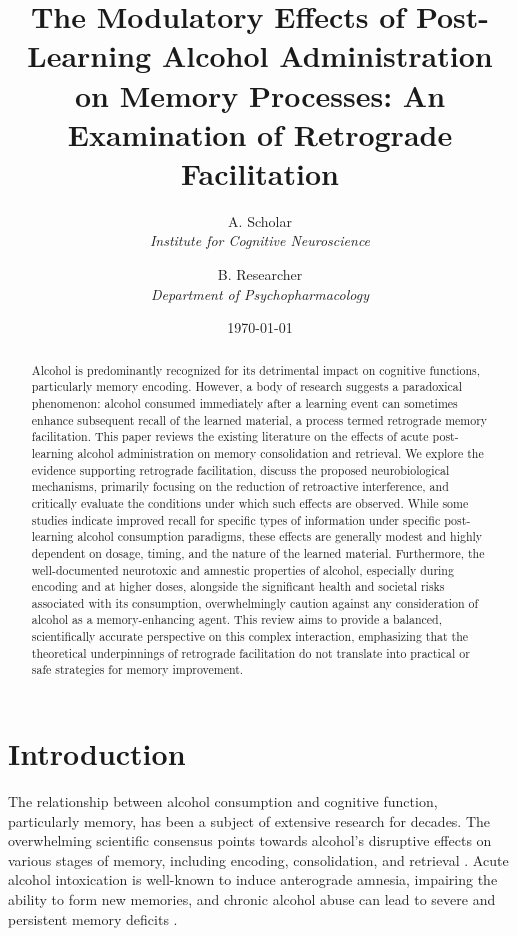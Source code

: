 \documentclass[12pt, a4paper]{article}
\title{The Modulatory Effects of Post-Learning Alcohol Administration on Memory Processes: An Examination of Retrograde Facilitation}
\author{A. Scholar \\ \textit{Institute for Cognitive Neuroscience} \and B. Researcher \\ \textit{Department of Psychopharmacology}}
\date{\today}
\begin{document}
\maketitle
\begin{abstract}
Alcohol is predominantly recognized for its detrimental impact on cognitive functions, particularly memory encoding. However, a body of research suggests a paradoxical phenomenon: alcohol consumed immediately after a learning event can sometimes enhance subsequent recall of the learned material, a process termed retrograde memory facilitation. This paper reviews the existing literature on the effects of acute post-learning alcohol administration on memory consolidation and retrieval. We explore the evidence supporting retrograde facilitation, discuss the proposed neurobiological mechanisms, primarily focusing on the reduction of retroactive interference, and critically evaluate the conditions under which such effects are observed. While some studies indicate improved recall for specific types of information under specific post-learning alcohol consumption paradigms, these effects are generally modest and highly dependent on dosage, timing, and the nature of the learned material. Furthermore, the well-documented neurotoxic and amnestic properties of alcohol, especially during encoding and at higher doses, alongside the significant health and societal risks associated with its consumption, overwhelmingly caution against any consideration of alcohol as a memory-enhancing agent. This review aims to provide a balanced, scientifically accurate perspective on this complex interaction, emphasizing that the theoretical underpinnings of retrograde facilitation do not translate into practical or safe strategies for memory improvement.
\end{abstract}

\tableofcontents
\newpage

\section{Introduction}
The relationship between alcohol consumption and cognitive function, particularly memory, has been a subject of extensive research for decades. The overwhelming scientific consensus points towards alcohol's disruptive effects on various stages of memory, including encoding, consolidation, and retrieval \cite{Ryback1971, Goodwin1973}. Acute alcohol intoxication is well-known to induce anterograde amnesia, impairing the ability to form new memories, and chronic alcohol abuse can lead to severe and persistent memory deficits \cite{OscarBerman2000}.
\end{document}
